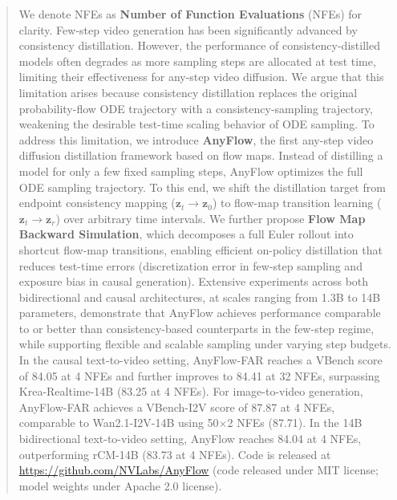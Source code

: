 \begin{abstract}
We denote NFEs as \textbf{Number of Function Evaluations} (NFEs) for clarity.
  Few-step video generation has been significantly advanced by consistency distillation.
  However, the performance of consistency-distilled models often degrades as more sampling steps are allocated at test time, limiting their effectiveness for any-step video diffusion.
  We argue that this limitation arises because consistency distillation replaces the original probability-flow ODE trajectory with a consistency-sampling trajectory, weakening the desirable test-time scaling behavior of ODE sampling.
  To address this limitation, we introduce \textbf{AnyFlow}, the first any-step video diffusion distillation framework based on flow maps.
  Instead of distilling a model for only a few fixed sampling steps, AnyFlow optimizes the full ODE sampling trajectory.
  To this end, we shift the distillation target from endpoint consistency mapping ($\mathbf{z}_t\!\to\!\mathbf{z}_0$) to flow-map transition learning ($\mathbf{z}_t\!\to\!\mathbf{z}_r$) over arbitrary time intervals.
  We further propose \textbf{Flow Map Backward Simulation}, which decomposes a full Euler rollout into shortcut flow-map transitions, enabling efficient on-policy distillation that reduces test-time errors (\ie discretization error in few-step sampling and exposure bias in causal generation).
  Extensive experiments across both bidirectional and causal architectures, at scales ranging from 1.3B to 14B parameters, demonstrate that AnyFlow achieves performance comparable to or better than consistency-based counterparts in the few-step regime, while supporting flexible and scalable sampling under varying step budgets. In the causal text-to-video setting, AnyFlow-FAR reaches a VBench score of 84.05 at 4 NFEs and further improves to 84.41 at 32 NFEs, surpassing Krea-Realtime-14B (83.25 at 4 NFEs). For image-to-video generation, AnyFlow-FAR achieves a VBench-I2V score of 87.87 at 4 NFEs, comparable to Wan2.1-I2V-14B using 50$\times$2 NFEs (87.71). In the 14B bidirectional text-to-video setting, AnyFlow reaches 84.04 at 4 NFEs, outperforming rCM-14B (83.73 at 4 NFEs).
  Code is released at \url{https://github.com/NVLabs/AnyFlow} (code released under MIT license; model weights under Apache 2.0 license).
\end{abstract}
